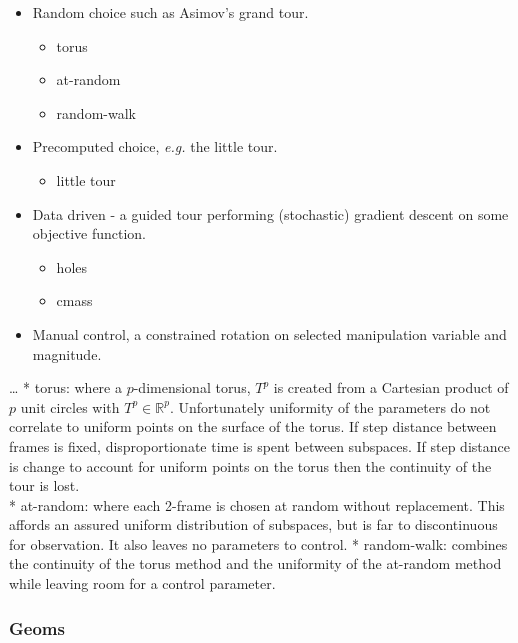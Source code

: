\documentclass{monashthesis}
\begin{document}
\begin{itemize}
\tightlist
\item
  Random choice such as Asimov's grand tour\autocite{asimov_grand_1985}.

  \begin{itemize}
  \tightlist
  \item
    torus
  \item
    at-random
  \item
    random-walk
  \end{itemize}
\item
  Precomputed choice, \emph{e.g.} the little
  tour\autocite{mcdonald_interactive_1982}.

  \begin{itemize}
  \tightlist
  \item
    little tour
  \end{itemize}
\item
  Data driven - a guided tour performing (stochastic) gradient descent
  on some objective function\autocite{hurley_analyzing_1990}.

  \begin{itemize}
  \tightlist
  \item
    holes
  \item
    cmass
  \end{itemize}
\item
  Manual control, a constrained rotation on selected manipulation
  variable and magnitude\autocite{cook_manual_1997}.
\end{itemize}

\ldots{} * torus: where a \(p\)-dimensional torus, \(T^p\) is created
from a Cartesian product of \(p\) unit circles with
\(T^p \in \mathbb{R}^p\). Unfortunately uniformity of the parameters do
not correlate to uniform points on the surface of the torus. If step
distance between frames is fixed, disproportionate time is spent between
subspaces. If step distance is change to account for uniform points on
the torus then the continuity of the tour is lost.\\
* at-random: where each 2-frame is chosen at random without replacement.
This affords an assured uniform distribution of subspaces, but is far to
discontinuous for observation. It also leaves no parameters to control.
* random-walk: combines the continuity of the torus method and the
uniformity of the at-random method while leaving room for a control
parameter.

\subsubsection{Geoms}\label{geoms}
\end{document}
